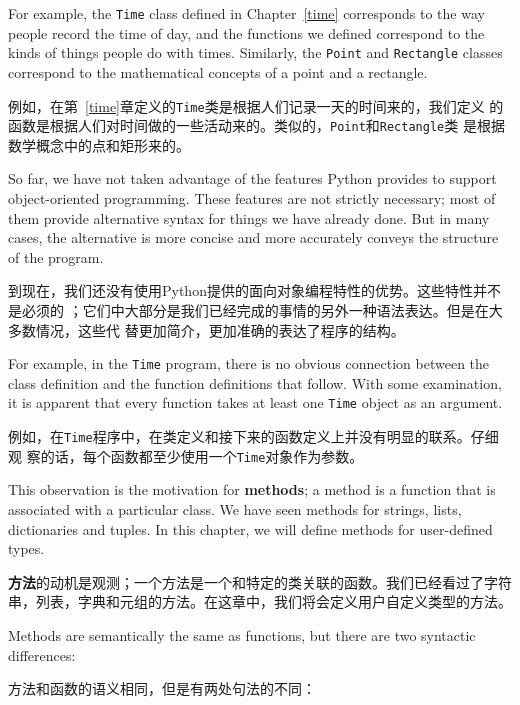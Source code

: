\documentclass[10pt]{book}
\begin{document}
\begin{CJK}{UTF8}{gbsn}
\begin{itemize}
\end{itemize}

For example, the {\tt Time} class defined in Chapter~\ref{time}
corresponds to the way people record the time of day, and the
functions we defined correspond to the kinds of things people do with
times.  Similarly, the {\tt Point} and {\tt Rectangle} classes
correspond to the mathematical concepts of a point and a rectangle.

例如，在第~\ref{time}章定义的{\tt Time}类是根据人们记录一天的时间来的，我们定义
的函数是根据人们对时间做的一些活动来的。类似的，{\tt Point}和{\tt Rectangle}类
是根据数学概念中的点和矩形来的。

So far, we have not taken advantage of the features Python provides to
support object-oriented programming.  These
features are not strictly necessary; most of them provide
alternative syntax for things we have already done.  But in many cases,
the alternative is more concise and more accurately conveys the
structure of the program.

到现在，我们还没有使用Python提供的面向对象编程特性的优势。这些特性并不是必须的
；它们中大部分是我们已经完成的事情的另外一种语法表达。但是在大多数情况，这些代
替更加简介，更加准确的表达了程序的结构。

For example, in the {\tt Time} program, there is no obvious
connection between the class definition and the function definitions
that follow.  With some examination, it is apparent that every function
takes at least one {\tt Time} object as an argument.

例如，在{\tt Time}程序中，在类定义和接下来的函数定义上并没有明显的联系。仔细观
察的话，每个函数都至少使用一个{\tt Time}对象作为参数。

This observation is the motivation for {\bf methods}; a method is
a function that is associated with a particular class.
We have seen methods for strings, lists, dictionaries and tuples.
In this chapter, we will define methods for user-defined types.

{\bf 方法}的动机是观测；一个方法是一个和特定的类关联的函数。我们已经看过了字符串，列表，字典和元组的方法。在这章中，我们将会定义用户自定义类型的方法。

Methods are semantically the same as functions, but there are
two syntactic differences:

方法和函数的语义相同，但是有两处句法的不同：

\begin{itemize}


\end{itemize}
\end{CJK}
\end{document}
